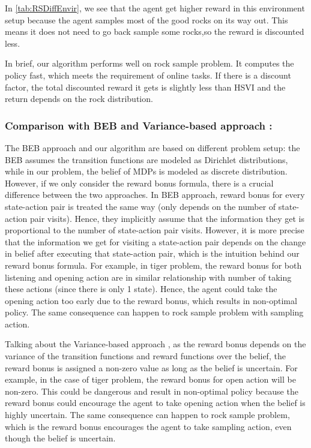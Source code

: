 \documentclass{article}
\begin{document}
In \autoref{tab:RSDiffEnvir}, we see that the agent get higher reward in this environment 
setup because the agent samples most of the good rocks on its way out. This means it does
not need to go back sample some rocks,so the reward is discounted less.

In brief, our algorithm performs well on rock sample problem. It computes the policy fast,
which meets the requirement of online tasks. If there is a discount factor, the total 
discounted reward it gets is slightly less than HSVI and the return depends on the rock 
distribution.

\subsubsection{Comparison with BEB \cite{kolter} and Variance-based approach \cite{sorg}:}

The BEB approach \cite{kolter} and our algorithm are based on different problem setup: the BEB
assumes the transition functions are modeled as Dirichlet distributions, while in our problem, the 
belief of MDPs is modeled as discrete distribution. However, if we only consider the reward
bonus formula, there is a crucial difference between the two approaches. In BEB approach, 
reward bonus for every state-action pair is treated the same way (only depends on the number
of state-action pair visits). Hence, they implicitly assume that the information they get
is proportional to the number of state-action pair visits. However, it is more precise that
the information we get for visiting a state-action pair depends on the change in belief
after executing that state-action pair, which is the intuition behind our reward bonus formula.
For example, in tiger problem, the reward bonus for both listening and opening action are in
similar relationship with number of taking these actions (since there is only 1 state). Hence,
the agent could take the opening action too early due to the reward bonus, which results in
non-optimal policy. The same consequence can happen to rock sample problem with sampling action.

Talking about the Variance-based approach \cite{sorg}, as the reward bonus depends on the variance of the
transition functions and reward functions over the belief, the reward bonus is assigned a
non-zero value as long as the belief is uncertain. For example, in the case of tiger
problem, the reward bonus for open action will be non-zero. This could be dangerous and result
in non-optimal policy because the reward bonus could encourage the agent to take opening action
when the belief is highly uncertain. The same consequence can happen to rock sample problem,
which is the reward bonus encourages the agent to take sampling action, even though the belief
is uncertain.
\end{document}
